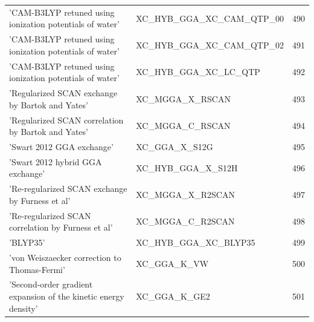 \documentclass[final,12pt]{article}
\begin{document}
{{{{{{\begin{table}[!h]
\begin{center}
\begin{tabular}{llr}
  'CAM-B3LYP retuned using ionization potentials of water' & XC\_HYB\_GGA\_XC\_CAM\_QTP\_00  &490\\
  'CAM-B3LYP retuned using ionization potentials of water' & XC\_HYB\_GGA\_XC\_CAM\_QTP\_02  &491\\
  'CAM-B3LYP retuned using ionization potentials of water' & XC\_HYB\_GGA\_XC\_LC\_QTP  &492\\
  'Regularized SCAN exchange by Bartok and Yates' & XC\_MGGA\_X\_RSCAN  &493\\
  'Regularized SCAN correlation by Bartok and Yates' & XC\_MGGA\_C\_RSCAN  &494\\
  'Swart 2012 GGA exchange' & XC\_GGA\_X\_S12G  &495\\
  'Swart 2012 hybrid GGA exchange' & XC\_HYB\_GGA\_X\_S12H  &496\\
  'Re-regularized SCAN exchange by Furness et al' & XC\_MGGA\_X\_R2SCAN  &497\\
  'Re-regularized SCAN correlation by Furness et al' & XC\_MGGA\_C\_R2SCAN  &498\\
  'BLYP35' & XC\_HYB\_GGA\_XC\_BLYP35  &499\\
  'von Weiszaecker correction to Thomas-Fermi' & XC\_GGA\_K\_VW  &500\\
  'Second-order gradient expansion of the kinetic energy density' & XC\_GGA\_K\_GE2  &501\\
\end{tabular}
\end{center}
\end{table}

}}}}}}
\end{document}
